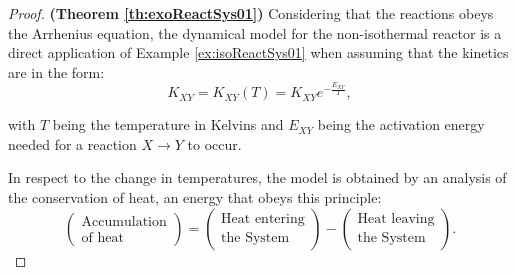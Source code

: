 \documentclass[a4paper,11pt]{book}
\numberwithin{figure}{chapter}
\numberwithin{equation}{chapter}
\numberwithin{table}{chapter}
\theoremstyle{definition}
\begin{document}
\begin{proof}{\textbf{(Theorem \ref{th:exoReactSys01})}}
    Considering that the reactions obeys the Arrhenius equation, the dynamical model for the non-isothermal reactor is a direct application of Example \ref{ex:isoReactSys01} when assuming that the kinetics are in the form:
    \begin{equation}
        K_{XY} = K_{XY}(T) = K_{XY} e^{-\frac{E_{XY}}{T}} 
    ,\end{equation}
    
    \noindent with $T$ being the temperature in Kelvins and $E_{XY}$ being the activation energy needed for a reaction $X \rightarrow Y$ to occur.

    In respect to the change in temperatures, the model is obtained by an analysis of the conservation of heat, an energy that obeys this principle: 
    \begin{equation} \label{eq:jacket01}
        \begin{pmatrix}
            \text{Accumulation} \\ \text{of heat}
        \end{pmatrix} = \begin{pmatrix}
            \text{Heat entering} \\ \text{the System}
        \end{pmatrix} - \begin{pmatrix}
            \text{Heat leaving} \\ \text{the System}
        \end{pmatrix}
    .\end{equation}
    

\end{proof}
\end{document}
